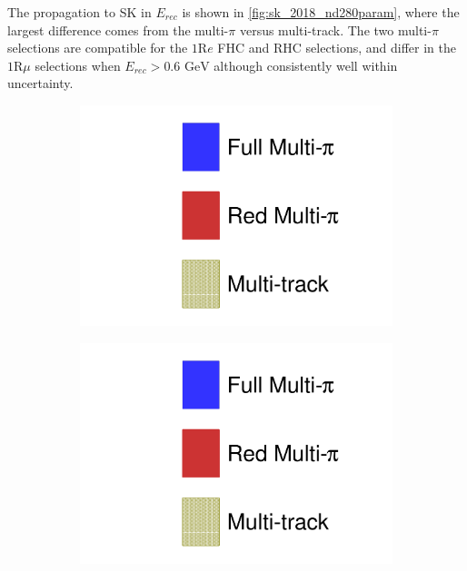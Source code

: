The propagation to SK in $E_{rec}$ is shown in \autoref{fig:sk_2018_nd280param}, where the largest difference comes from the multi-$\pi$ versus multi-track. The two multi-$\pi$ selections are compatible for the $1\text{R}e$ FHC and RHC selections, and differ in the $1\text{R}\mu$ selections when $E_{rec}>0.6\text{ GeV}$ although consistently well within uncertainty.
\begin{figure}[h]
	\begin{subfigure}[t]{0.32\textwidth}
		\includegraphics[width=\textwidth, trim={0mm 0mm 0mm 0mm}, clip, page=1]{figures/mach3/2018/data/2018_results_test_spectra_2018_results_test_redcov_spectra_2018_results_test_multitrack_spectra}
	\end{subfigure}
	\begin{subfigure}[t]{0.32\textwidth}
		\includegraphics[width=\textwidth, trim={0mm 0mm 0mm 0mm}, clip, page=5]{figures/mach3/2018/data/2018_results_test_spectra_2018_results_test_redcov_spectra_2018_results_test_multitrack_spectra}

\end{subfigure}
\end{figure}

